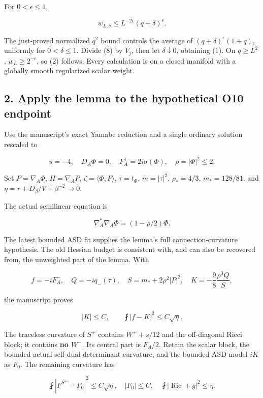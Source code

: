 \documentclass[11pt]{article}
\begin{document}
For \(0<\epsilon\le1\),

\[
 w_{L,\delta}\le L^{-2\epsilon}(q+\delta)^\epsilon.
\]

The just-proved normalized \(q^2\) bound controls the average of
\((q+\delta)^\epsilon(1+q)\), uniformly for \(0<\delta\le1\). Divide (8)
by \(V_j\), then let \(\delta\downarrow0\), obtaining (1). On
\(q\ge L^2\), \(w_L\ge2^{-\epsilon}\), so (2) follows. Every calculation
is on a closed manifold with a globally smooth regularized scalar
weight.

\hypertarget{apply-the-lemma-to-the-hypothetical-o10-endpoint}{%
\subsection{2. Apply the lemma to the hypothetical O10
endpoint}\label{apply-the-lemma-to-the-hypothetical-o10-endpoint}}

Use the manuscript's exact Yamabe reduction and a single ordinary
solution rescaled to

\[
 s=-4,\quad D_A\Phi=0,\quad F_A^+=2i\sigma(\Phi),
 \quad \rho=|\Phi|^2\le2.
\]

Set \(P=\nabla_A\Phi\), \(H=\nabla_AP\), \(\zeta=\langle\Phi,P\rangle\),
\(\tau=t_\Phi\), \(m=|\tau|^2\), \(\rho_*=4/3\), \(m_*=128/81\), and
\(\eta=r+D_\beta/V+\beta^{-2}\to0\).

The actual semilinear equation is

\[
 \nabla_A^*\nabla_A\Phi=(1-\rho/2)\Phi.\tag{9}
\]

The latest bounded ASD fit supplies the lemma's full
connection-curvature hypothesis. The old Hessian budget is consistent
with, and can also be recovered from, the unweighted part of the lemma.
With

\[
 f=-iF_A^-,\quad Q=-iq_-(\tau),\quad
 S=m_*+2\rho^2|P|^2,\quad
 K=-\frac98\frac{\rho^3Q}{S},
\]

the manuscript proves

\[
 |K|\le C,\qquad \fint|f-K|^2\le C\sqrt\eta.
\tag{10}
\]

The traceless curvature of \(S^+\) contains \(W^++s/12\) and the
off-diagonal Ricci block; it contains \textbf{no \(W^-\)}. Its central
part is \(F_A/2\). Retain the scalar block, the bounded actual self-dual
determinant curvature, and the bounded ASD model \(iK\) as \(F_0\). The
remaining curvature has

\[
 \fint|F^{S^+}-F_0|^2\le C\sqrt\eta,
 \quad |F_0|\le C,
 \quad \fint|\operatorname{Ric}+g|^2\le\eta.
\tag{11}
\]
\end{document}
